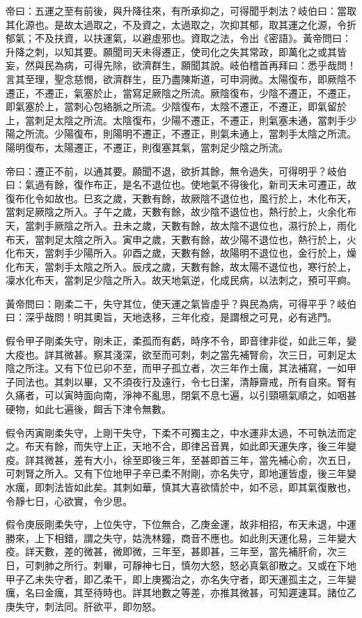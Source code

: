 帝曰：五運之至有前後，與升降往來，有所承抑之，可得聞乎刺法？岐伯曰：當取其化源也。是故太過取之，不及資之，太過取之，次抑其郁，取其運之化源，令折郁氣；不及扶資，以扶運氣，以避虛邪也。資取之法，令出《密語》。黃帝問曰：升降之刺，以知其要。願聞司天未得遷正，使司化之失其常政，即萬化之或其皆妄，然與民為病，可得先除，欲濟群生，願聞其說。岐伯稽首再拜曰：悉乎哉問！言其至理，聖念慈憫，欲濟群生，臣乃盡陳斯道，可申洞微。太陽復布，即厥陰不遷正，不遷正，氣塞於止，當寫足厥陰之所流。厥陰復布，少陰不遷正，不遷正，即氣塞於上，當刺心包絡脈之所流。少陰復布，太陰不遷正，不遷正，即氣留於上，當刺足太陰之所流。太陰復布，少陽不遷正，不遷正，則氣塞未通，當刺手少陽之所流。少陽復布，則陽明不遷正，不遷正，則氣未通上，當刺手太陰之所流。陽明復布，太陽遷正，不遷正，則復塞其氣，當刺足少陰之所流。

帝曰：遷正不前，以通其要。願聞不退，欲折其餘，無令過失，可得明乎？岐伯曰：氣過有餘，復作布正，是名不退位也。使地氣不得後化，新司天未可遷正，故復布化令如故也。巳亥之歲，天數有餘，故厥陰不退位也，風行於上，木化布天，當刺足厥陰之所入。子午之歲，天數有餘，故少陰不退位也，熱行於上，火余化布天，當刺手厥陰之所入。丑未之歲，天數有餘，故太陰不退位也，濕行於上，雨化布天，當刺足太陰之所入。寅申之歲，天數有餘，故少陽不退位也，熱行於上，火化布天，當刺手少陽所入。卯酉之歲，天數有餘，故陽明不退位也，金行於上，燥化布天，當刺手太陰之所入。辰戌之歲，天數有餘，故太陽不退位也，寒行於上，凜水化布天，當刺足少陰之所入。故天地氣逆，化成民病，以法刺之，預可平痾。

黃帝問曰：剛柔二干，失守其位，使天運之氣皆虛乎？與民為病，可得平乎？岐伯曰：深乎哉問！明其奧旨，天地迭移，三年化疫，是謂根之可見，必有逃門。

假令甲子剛柔失守，剛未正，柔孤而有虧，時序不令，即音律非從，如此三年，變大疫也。詳其微甚。察其淺深，欲至而可刺，刺之當先補腎俞，次三日，可刺足太陰之所注。又有下位已卯不至，而甲子孤立者，次三年作土癘，其法補寫，一如甲子同法也。其刺以畢，又不須夜行及遠行，令七日潔，清靜齋戒，所有自來。腎有久痛者，可以寅時面向南，淨神不亂思，閉氣不息七遍，以引頸嚥氣順之，如咽甚硬物，如此七遍後，餌舌下津令無數。

假令丙寅剛柔失守，上剛干失守，下柔不可獨主之，中水運非太過，不可執法而定之。布天有餘，而失守上正，天地不合，即律呂音異，如此即天運失序，後三年變疫。詳其微甚，差有大小，徐至即後三年，至甚即首三年，當先補心俞，次五日，可刺腎之所入。又有下位地甲子辛已柔不附剛，亦名失守，即地運皆虛，後三年變水癘，即刺法皆如此矣。其刺如華，慎其大喜欲情於中，如不忌，即其氣復散也，令靜七日，心欲實，令少思。

假令庚辰剛柔失守，上位失守，下位無合，乙庚金運，故非相招，布天未退，中運勝來，上下相錯，謂之失守，姑洗林鐘，商音不應也。如此則天運化易，三年變大疫。詳天數，差的微甚，微即微，三年至，甚即甚，三年至，當先補肝俞，次三日，可刺肺之所行。刺畢，可靜神七日，慎勿大怒，怒必真氣卻散之。又或在下地甲子乙未失守者，即乙柔干，即上庚獨治之，亦名失守者，即天運孤主之，三年變癘，名曰金癘，其至待時也。詳其地數之等差，亦推其微甚，可知遲速耳。諸位乙庚失守，刺法同。肝欲平，即勿怒。

